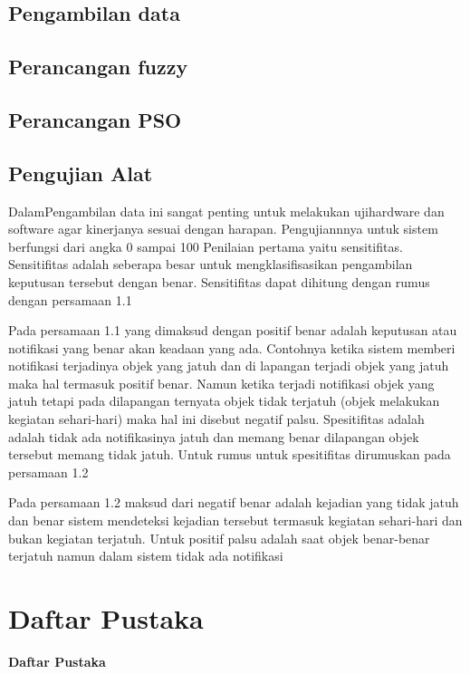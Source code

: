 \documentclass[11pt]{article}
\numberwithin{equation}{subsection}
\begin{document}
\subsection{Pengambilan data}

\subsection{Perancangan fuzzy}

\subsection{Perancangan PSO}

\subsection{Pengujian Alat}

DalamPengambilan data ini sangat penting untuk melakukan ujihardware dan software agar kinerjanya sesuai dengan harapan.
Pengujiannnya untuk sistem berfungsi dari angka 0 sampai 100%
Penilaian pertama yaitu sensitifitas.
Sensitifitas adalah seberapa  besar untuk mengklasifisasikan pengambilan keputusan tersebut dengan benar.
Sensitifitas dapat dihitung dengan rumus  dengan persamaan 1.1

Pada persamaan 1.1 yang dimaksud dengan positif benar adalah keputusan atau notifikasi yang benar akan keadaan yang ada.
Contohnya ketika sistem memberi notifikasi terjadinya objek yang jatuh dan di lapangan terjadi objek yang jatuh maka hal termasuk positif benar.
Namun ketika terjadi notifikasi objek yang jatuh tetapi pada dilapangan ternyata objek tidak terjatuh (objek melakukan kegiatan sehari-hari) maka hal ini disebut negatif palsu.
Spesitifitas adalah adalah tidak ada notifikasinya jatuh dan memang benar dilapangan objek tersebut memang tidak jatuh. Untuk rumus untuk spesitifitas dirumuskan pada persamaan 1.2

Pada persamaan 1.2 maksud dari negatif benar adalah kejadian yang tidak jatuh dan benar sistem mendeteksi kejadian tersebut termasuk kegiatan sehari-hari dan bukan kegiatan terjatuh.
Untuk positif palsu adalah saat objek benar-benar terjatuh namun dalam sistem tidak ada notifikasi 
\newpage

\section{Daftar Pustaka}

\begin{center}
	\textbf{Daftar Pustaka}
\end{center}

	
	
\end{document}
